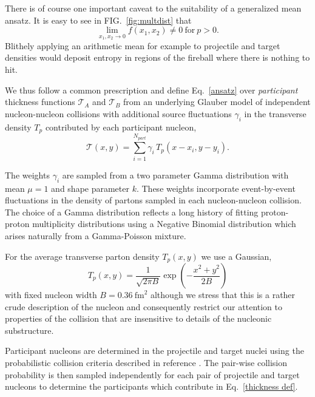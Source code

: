 \documentclass[aps,prl,reprint,amsmath,nofootinbib]{revtex4-1}
\begin{document}
There is of course one important caveat to the suitability of a generalized mean ansatz. It is easy to see in
FIG.~\ref{fig:multdist} that
\begin{equation}
  \lim\limits_{x_1,x_2 \to 0} f(x_1,x_2) \ne 0 ~\mathrm{for} ~ p>0.
\end{equation}
Blithely applying an arithmetic mean for example to projectile and target densities would deposit entropy in
regions of the fireball where there is nothing to hit.

We thus follow a common prescription and define Eq.~\eqref{ansatz} over \emph{participant} thickness
functions $\mathcal{T}_A$ and $\mathcal{T}_B$ from an underlying Glauber model of independent nucleon-nucleon
collisions with additional source fluctuations $\gamma_i$ in the transverse density $T_p$ contributed by each
participant nucleon,
\begin{equation}
  \label{thickness def}
  \mathcal{T}(x,y) = \sum\limits_{i=1}^{N_{part}} \gamma_i\, T_p(x-x_i,y-y_i).
\end{equation}

The weights $\gamma_i$ are sampled from a two parameter Gamma distribution with mean $\mu=1$ and shape
parameter $k$. These weights incorporate event-by-event fluctuations in the density of partons sampled in each
nucleon-nucleon collision. The choice of a Gamma distribution reflects a long history of fitting proton-proton
multiplicity distributions using a Negative Binomial distribution which arises naturally from a Gamma-Poisson
mixture.

For the average transverse parton density $T_p(x,y)$ we use a Gaussian,
\begin{equation}
  T_p(x,y) = \frac{1}{\sqrt{2 \pi B}} \exp\left(-\frac{x^2+y^2}{2 B}\right)
\end{equation}
with fixed nucleon width $B=0.36 ~\mathrm{fm}^2$ although we stress that this is a rather crude description of
the nucleon and consequently restrict our attention to properties of the collision that are insensitive to
details of the nucleonic substructure.

Participant nucleons are determined in the projectile and target nuclei using the probabilistic collision
criteria described in reference \cite{proton-proton}.  The pair-wise collision probability is then sampled
independently for each pair of projectile and target nucleons to determine the participants which contribute
in Eq.~\eqref{thickness def}.
\end{document}
